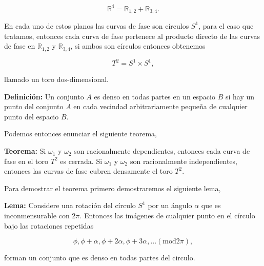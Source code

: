 \documentclass[a4paper,10pt]{article}
\numberwithin{equation}{section}
\newcommand{\definicion}{\textbf{Definición: }}
\newcommand{\lema}{\textbf{Lema: }}
\newcommand{\teorema}{\textbf{Teorema: }}
\begin{document}
\begin{equation}
 \mathbb{R}^4 = \mathbb{R}_{1,2} + \mathbb{R}_{3,4}.
\end{equation}

En cada uno de estos planos las curvas de fase son círculos $S^1$, para el caso que tratamos, entonces cada 
curva de fase pertenece al producto directo de las curvas de fase en $\mathbb{R}_{1,2}$ y
$\mathbb{R}_{3,4}$, si ambos son círculos entonces obtenemos 


\begin{equation}
 T^2 = S^1 \times S^1,
\end{equation}

llamado un toro dos-dimensional. 

\vspace{.3cm}

\definicion Un conjunto $A$ es denso en todas partes en un espacio $B$ 
si hay un punto del conjunto $A$ en cada vecindad arbitrariamente pequeña de 
cualquier punto del espacio $B$.

\vspace{.3cm}

Podemos entonces enunciar el siguiente teorema,

\vspace{.3cm}

\teorema Si $\omega_1$ y $\omega_2$ son racionalmente dependientes, entonces 
cada curva de fase en el toro $T^2$ es cerrada. Si $\omega_1$ y $\omega_2$ son racionalmente
independientes, entonces las curvas de fase cubren densamente el toro $T^2$. 

\vspace{.3cm}

Para demostrar el teorema primero demostraremos el siguiente lema,

\vspace{.3cm}

\lema Considere una rotación del círculo $S^1$ por un ángulo $\alpha$ que 
es inconmensurable con $2\pi$. Entonces las imágenes de cualquier punto en el círculo 
bajo las rotaciones repetidas

\begin{equation}
 \phi, \phi + \alpha, \phi + 2\alpha, \phi + 3\alpha, \dots (\text{mod} 2\pi),
\end{equation}

forman un conjunto que es denso en todas partes del circulo.

\vspace{.3cm}
\end{document}
